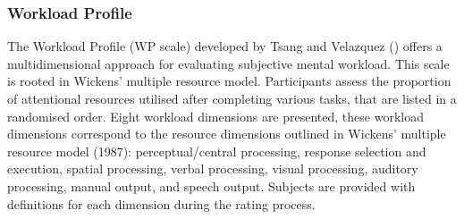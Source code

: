 \documentclass[man]{apa7}
\begin{document}
\subsubsection{Workload Profile}
The Workload Profile (WP scale) developed by Tsang and Velazquez (\citeyear{Tsang1996DiagnosticityRatings}) offers a multidimensional approach for evaluating subjective mental workload. This scale is rooted in Wickens' multiple resource model. Participants assess the proportion of attentional resources utilised after completing various tasks, that are listed in a randomised order. Eight workload dimensions are presented, these workload dimensions correspond to the resource dimensions outlined in Wickens' multiple resource model (1987): perceptual/central processing, response selection and execution, spatial processing, verbal processing, visual processing, auditory processing, manual output, and speech output. Subjects are provided with definitions for each dimension during the rating process.
\end{document}
